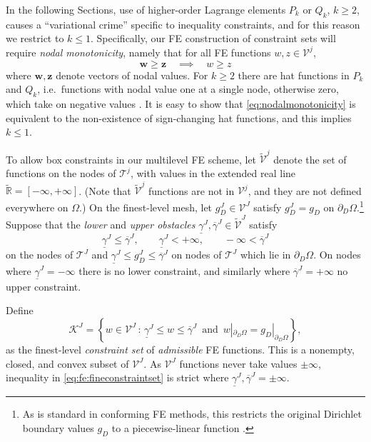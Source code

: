 \documentclass[letterpaper,final,12pt,reqno]{amsart}
\theoremstyle{cstyle}
\theoremstyle{cstyle*}
\theoremstyle{dstyle}
\numberwithin{equation}{section}
\numberwithin{figure}{section}
\numberwithin{table}{section}
\numberwithin{theorem}{section}
\newcommand{\RR}{\mathbb{R}}
\newcommand{\bw}{\mathbf{w}}
\newcommand{\bz}{\mathbf{z}}
\begin{document}
In the following Sections, use of higher-order Lagrange elements $P_k$ or $Q_k$, $k\ge 2$, causes a ``variational crime'' \cite[Chapter 10]{BrennerScott2007} specific to inequality constraints, and for this reason we restrict to $k\le 1$.  Specifically, our FE construction of constraint sets will require \emph{nodal monotonicity}, namely that for all FE functions $w,z \in \mathcal{V}^j$,
\begin{equation}
\bw \ge \bz \quad \implies \quad w \ge z \label{eq:nodalmonotonicity}
\end{equation}
where $\bw,\bz$ denote vectors of nodal values.  For $k\ge 2$ there are hat functions in $P_k$ and $Q_k$, i.e.~functions with nodal value one at a single node, otherwise zero, which take on negative values \cite[Figure 1.7]{Elmanetal2014}.  It is easy to show that \eqref{eq:nodalmonotonicity} is equivalent to the non-existence of sign-changing hat functions, and this implies $k\le 1$.

To allow box constraints in our multilevel FE scheme, let $\tilde{\mathcal{V}}^j$ denote the set of functions on the nodes of $\mathcal{T}^j$, with values in the extended real line $\tilde{\RR} = [-\infty,+\infty]$.  (Note that $\tilde{\mathcal{V}}^j$ functions are not in $\mathcal{V}^j$, and they are not defined everywhere on $\Omega$.)  On the finest-level mesh, let $g_D^J \in \mathcal{V}^J$ satisfy $g_D^J = g_D$ on $\partial_D \Omega$.\footnote{As is standard in conforming FE methods, this restricts the original Dirichlet boundary values $g_D$ to a piecewise-linear function \cite{Elmanetal2014}.}  Suppose that the \emph{lower} and \emph{upper obstacles} $\underline{\gamma}^J, \overline{\gamma}^J \in \tilde{\mathcal{V}}^J$ satisfy
\begin{equation}
\underline{\gamma}^J \le \overline{\gamma}^J, \qquad \underline{\gamma}^J < +\infty, \qquad -\infty < \overline{\gamma}^J \label{eq:fe:boxconstraintrequirements}
\end{equation}
on the nodes of $\mathcal{T}^J$ and $\underline{\gamma}^J \le g_D^J \le \overline{\gamma}^J$ on nodes of $\mathcal{T}^J$ which lie in $\partial_D \Omega$.  On nodes where $\underline{\gamma}^J=-\infty$ there is no lower constraint, and similarly where $\overline{\gamma}^J=+\infty$ no upper constraint.

Define
\begin{equation}
\mathcal{K}^J = \left\{w \in \mathcal{V}^J\,:\,\underline{\gamma}^J \le w \le \overline{\gamma}^J \, \text{ and } \, w|_{\partial_D\Omega} = g_D|_{\partial_D\Omega}\right\}, \label{eq:fe:fineconstraintset}
\end{equation}
as the finest-level \emph{constraint set} of \emph{admissible} FE functions.  This is a nonempty, closed, and convex subset of $\mathcal{V}^J$.  As $\mathcal{V}^J$ functions never take values $\pm\infty$, inequality in \eqref{eq:fe:fineconstraintset} is strict where $\underline{\gamma}^J, \overline{\gamma}^J = \pm \infty$.
\end{document}
